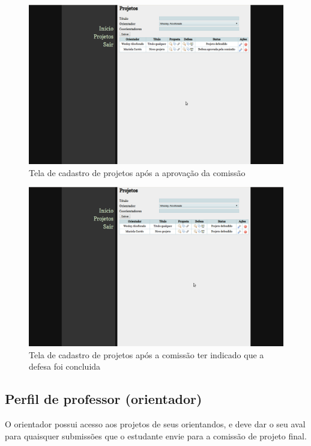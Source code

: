 \begin{figure}[htbp]
\centering
\includegraphics[width=1\textwidth]{fig/telas/processo/aluno_10_defesa_analisada_comissao.png}
\caption{Tela de cadastro de projetos após a aprovação da comissão}
\label{fig:aluno_10_defesa_analisada_comissao}
\end{figure}

\begin{figure}[htbp]
\centering
\includegraphics[width=1\textwidth]{fig/telas/processo/aluno_11_projeto_defendido.png}
\caption{Tela de cadastro de projetos após a comissão ter indicado que a defesa foi concluida}
\label{fig:aluno_11_projeto_defendido}
\end{figure}

\subsection{Perfil de professor (orientador)}
O orientador possui acesso aos projetos de seus orientandos, e deve dar o seu aval para quaisquer 
submissões que o estudante envie para a comissão de projeto final.

